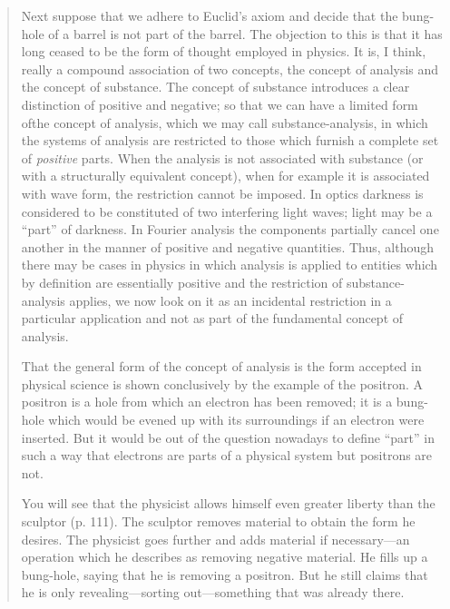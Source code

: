 \begin{quote}
    Next suppose that we adhere to Euclid's axiom and decide that the bung-hole of a barrel is not part of the barrel.  The objection to this is that it has long ceased to be the form of thought employed in physics.  It is, I think, really a compound association of two concepts, the concept of analysis and the concept of substance.  The concept of substance introduces a clear distinction of positive and negative; so that we can have a limited form ofthe concept of analysis, which we may call substance-analysis, in which the systems of analysis are restricted to those which furnish a complete set of \emph{positive} parts.  When the analysis is not associated with substance (or with a structurally equivalent concept), when for example it is associated with wave form, the restriction cannot be imposed.  In optics darkness is considered to be constituted of two interfering light waves; light may be a ``part'' of darkness.  In Fourier analysis the components partially cancel one another in the manner of positive and negative quantities.  Thus, although there may be cases in physics in which analysis is applied to entities which by definition are essentially positive and the restriction of substance-analysis applies, we now look on it as an incidental restriction in a particular application and not as part of the fundamental concept of analysis.  

    That the general form of the concept of analysis is the form accepted in physical science is shown conclusively by the example of the positron.  A positron is a hole from which an electron has been removed; it is a bung-hole which would be evened up with its surroundings if an electron were inserted.  But it would be out of the question nowadays to define ``part'' in such a way that electrons are parts of a physical system but positrons are not.  

    You will see that the physicist allows himself even greater liberty than the sculptor (p. 111). The sculptor removes material to obtain the form he desires.  The physicist goes further and adds material if necessary---an operation which he describes as removing negative material.  He fills up a bung-hole, saying that he is removing a positron.  But he still claims that he is only revealing---sorting out---something that was already there.  \citep[p. 120-121]{Eddington1939}
\end{quote}


